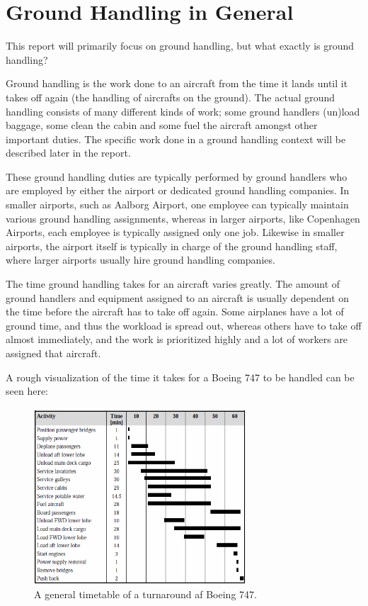 \section{Ground Handling in General}
This report will primarily focus on ground handling, but what exactly is ground handling?

Ground handling is the work done to an aircraft from the time it lands until it takes off again (the handling of aircrafts on the ground). The actual ground handling consists of many different kinds of work; some ground handlers (un)load baggage, some clean the cabin and some fuel the aircraft amongst other important duties. The specific work done in a ground handling context will be described later in the report.

These ground handling duties are typically performed by ground handlers who are employed by either the airport or dedicated ground handling companies. In smaller airports, such as Aalborg Airport, one employee can typically maintain various ground handling assignments, whereas in larger airports, like Copenhagen Airports, each employee is typically assigned only one job. Likewise in smaller airports, the airport itself is typically in charge of the ground handling staff, where larger airports usually hire ground handling companies.

The time ground handling takes for an aircraft varies greatly. The amount of ground handlers and equipment assigned to an aircraft is usually dependent on the time before the aircraft has to take off again. Some airplanes have a lot of ground time, and thus the workload is spread out, whereas others have to take off almost immediately, and the work is prioritized highly and a lot of workers are assigned that aircraft.


A rough visualization of the time it takes for a Boeing 747 to be handled can be seen here:
\begin{figure}[H]
\centering
\includegraphics[width=300px]{Grafik/timetable}
\caption{A general timetable of a turnaround af Boeing 747.}
\label{timetable}
\end{figure}